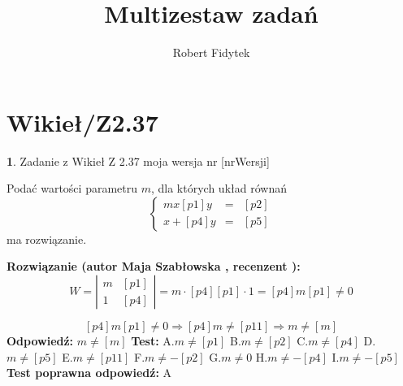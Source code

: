 \documentclass[12pt, a4paper]{article}
\title{Multizestaw zadań}
\author{Robert Fidytek}
\date{}
\theoremstyle{definition} %
\newtheorem{zad}{}
\newcommand{\kategoria}[1]{\section{#1}} %
\newcommand{\zadStart}[1]{\begin{zad}#1\newline} %
\newcommand{\zadStop}{\end{zad}}   %
\newcommand{\rozwStart}[2]{\noindent \textbf{Rozwiązanie (autor #1 , recenzent #2): }\newline} %
\newcommand{\rozwStop}{\newline}                                            %
\newcommand{\odpStart}{\noindent \textbf{Odpowiedź:}\newline}    %
\newcommand{\odpStop}{\newline}                                             %
\newcommand{\testStart}{\noindent \textbf{Test:}\newline} %
\newcommand{\testStop}{\newline} %
\newcommand{\kluczStart}{\noindent \textbf{Test poprawna odpowiedź:}\newline} %
\newcommand{\kluczStop}{\newline} %
\begin{document}
\maketitle


\kategoria{Wikieł/Z2.37}
\zadStart{Zadanie z Wikieł Z 2.37  moja wersja nr [nrWersji]}


Podać wartości parametru $m$, dla których układ równań
$$\left\{\begin{array}{rcl}
mx [p1]y&=&[p2]\\
 x+[p4]y&=&[p5]
\end{array} \right.$$
ma rozwiązanie.
\zadStop
\rozwStart{Maja Szabłowska}{}
$$W=\left| \begin{array}{lccr} m & [p1]  \\ 1 & [p4] \end{array}\right| = m\cdot [p4] [p1]\cdot 1=[p4]m [p1] \neq 0$$

$$[p4]m [p1] \neq 0 \Rightarrow [p4]m\neq [p11] \Rightarrow m\neq [m]$$
\rozwStop
\odpStart
$m\neq [m]$
\odpStop
\testStart
A.$m\neq [p1]$
B.$m\neq [p2]$
C.$m\neq [p4]$
D.$m\neq [p5]$
E.$m\neq [p11]$
F.$m\neq -[p2]$
G.$m\neq 0$
H.$m\neq -[p4]$
I.$m\neq -[p5]$
\testStop
\kluczStart
A
\kluczStop
\end{document}
